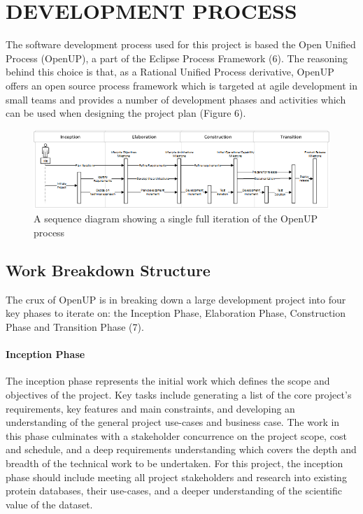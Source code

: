 \section{DEVELOPMENT PROCESS \hrulefill}

The software development process used for this project is based the Open Unified
Process (OpenUP), a part of the Eclipse Process Framework (6). The reasoning
behind this choice is that, as a Rational Unified Process derivative, OpenUP
offers an open source process framework which is targeted at agile development
in small teams and provides a number of development phases and activities which
can be used when designing the project plan (Figure 6).

\begin{figure}[H]
\centering
\includegraphics{assets/sequence-openup.png}
\caption{A sequence diagram showing a single full iteration of the OpenUP
  process}
\label{fig:sequence-openup}
\end{figure}

\subsection{Work Breakdown Structure}
The crux of OpenUP is in breaking down a large development project into four key
phases to iterate on: the Inception Phase, Elaboration Phase, Construction Phase
and Transition Phase (7).

\paragraph{Inception Phase} The inception phase represents the initial work
which defines the scope and objectives of the project. Key tasks include
generating a list of the core project's requirements, key features and main
constraints, and developing an understanding of the general project use-cases
and business case. The work in this phase culminates with a stakeholder
concurrence on the project scope, cost and schedule, and a deep requirements
understanding which covers the depth and breadth of the technical work to be
undertaken. For this project, the inception phase should include meeting all
project stakeholders and research into existing protein databases, their
use-cases, and a deeper understanding of the scientific value of the dataset.

